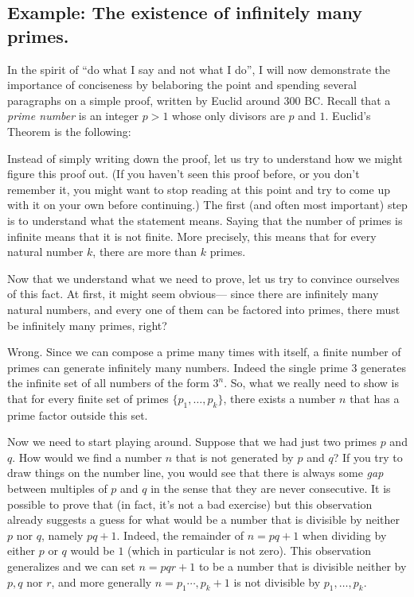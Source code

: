 \subsection{Example: The existence of infinitely many
primes.}\label{0-Example-The-existence-}

In the spirit of ``do what I say and not what I do'', I will now
demonstrate the importance of conciseness by belaboring the point and
spending several paragraphs on a simple proof, written by Euclid around
300 BC. Recall that a \emph{prime number} is an integer \(p>1\) whose
only divisors are \(p\) and \(1\). Euclid's Theorem is the following:

\hypertarget{infprimesthm}{}

Instead of simply writing down the proof, let us try to understand how
we might figure this proof out. (If you haven't seen this proof before,
or you don't remember it, you might want to stop reading at this point
and try to come up with it on your own before continuing.) The first
(and often most important) step is to understand what the statement
means. Saying that the number of primes is infinite means that it is not
finite. More precisely, this means that for every natural number \(k\),
there are more than \(k\) primes.

Now that we understand what we need to prove, let us try to convince
ourselves of this fact. At first, it might seem obvious--- since there
are infinitely many natural numbers, and every one of them can be
factored into primes, there must be infinitely many primes, right?

Wrong. Since we can compose a prime many times with itself, a finite
number of primes can generate infinitely many numbers. Indeed the single
prime \(3\) generates the infinite set of all numbers of the form
\(3^n\). So, what we really need to show is that for every finite set of
primes \(\{ p_1,\ldots,p_k\}\), there exists a number \(n\) that has a
prime factor outside this set.

Now we need to start playing around. Suppose that we had just two primes
\(p\) and \(q\). How would we find a number \(n\) that is not generated
by \(p\) and \(q\)? If you try to draw things on the number line, you
would see that there is always some \emph{gap} between multiples of
\(p\) and \(q\) in the sense that they are never consecutive. It is
possible to prove that (in fact, it's not a bad exercise) but this
observation already suggests a guess for what would be a number that is
divisible by neither \(p\) nor \(q\), namely \(pq+1\). Indeed, the
remainder of \(n=pq+1\) when dividing by either \(p\) or \(q\) would be
\(1\) (which in particular is not zero). This observation generalizes
and we can set \(n=pqr+1\) to be a number that is divisible neither by
\(p,q\) nor \(r\), and more generally \(n=p_1\cdots, p_k +1\) is not
divisible by \(p_1,\ldots,p_k\).

